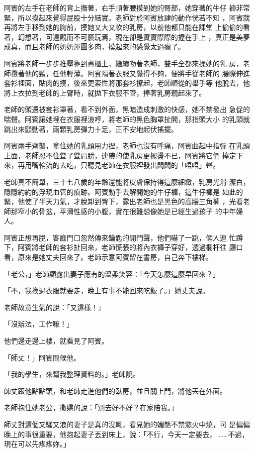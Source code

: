 阿賓的左手在老師的背上撫著，右手順著腰摸到她的臀部，她穿著的牛仔
褲非常緊，所以摸起來覺得屁股十分結實。老師對於阿賓放肆的動作恍若不知
，阿賓就再將左手移到她的胸前，摸她又大又軟的乳房，以前他都只能在課堂
上偷偷的看著，幻想著，可遠觀而不可褻玩焉，現在卻是實實際際的握在手上
，真正是美夢成真，而且老師的奶奶渾圓多肉，摸起來的感覺太過癮了。

阿賓將老師一步步推壓靠到書櫃上，繼續吻著老師，雙手全都來揉她的乳
房，老師攬著他的頸，任他輕薄。阿賓隔著衣服又覺得不夠，便將手從老師的
腰際伸進套衫裡面，貼肉的摸，後來更索性將那套衫撩起，老師順從的舉手等
他脫去，他將上衣拉到老師的上臂時，就拋下衣服不管，捧著乳房親起來了。

老師的頭還被套衫罩著，看不到外面，黑暗造成刺激的快感，她不禁發出
急促的喘聲。阿賓讓她埋在衣服裡浪哼，將老師的黑色胸罩扯開，那指頭大小
的乳頭就跳出來顫動著，兩顆乳房彈力十足，正不安地起伏搖擺。

阿賓兩手齊襲，拿住她的乳頭用力捏，老師也沒有呼痛，阿賓曲起中指彈
在乳頭上面，老師忍不住聳了聳肩膀，連帶的使乳房更擺盪不已，阿賓將它們
捧定下來，再用嘴輪流的去吃，只聽見老師在衣服裡發出悶悶的「唔唔」聲。

老師真不簡單，三十七八歲的年齡還能將皮膚保持得這麼細緻，乳房光滑
潔白，隱隱約約的浮現血管的痕跡。阿賓動手去解開她的牛仔褲，這牛仔褲是
如此的緊，他使了半天力氣，才脫卸到臀下，露出老師也是黑色的高腰三角褲
，光看老師那窄小的骨盆，平滑性感的小腹，實在很難想像她是已經生過孩子
的中年婦人。

阿賓正想再脫，客廳門口忽然傳來鑰匙的開門聲，他們嚇了一跳，倆人連
忙蹲下，阿賓將老師的套衫扯回來，老師慌張的將內衣褲子穿好，透過欄杆往
廳口看，原來是她丈夫回來了。老師示意阿賓留在書房，自己奔下樓梯。

「老公，」老師顯露出妻子應有的溫柔笑容：「今天怎麼這麼早回來？」

「不，我換過衣服就要走，晚上有事不能回來吃飯了。」她丈夫說。

老師故意生氣的說：「又這樣！」

「沒辦法，工作嘛！」

他們邊走邊上樓，就看見了阿賓。

「師丈！」阿賓問候他。

「我的學生，來幫我整理資料的。」老師說。

師丈跟他點點頭，和老師走進他們的臥房，並且關上門，將他丟在外面。

老師抱住她老公，撒嬌的說：「別去好不好？在家陪我。」

師丈對這個又騷又浪的妻子是真的沒輒，看見她的媚態不禁慾火中燒，可
是偏偏晚上的事很重要，他抱起妻子丟到床上，說：「不行，今天一定要去，
……不過，現在可以先疼疼妳。」

